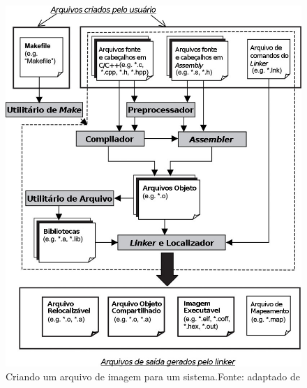 \begin{figure}[H]
    \scriptsize
     \centering
     \includegraphics[scale=0.42]{dados/figuras/Linker.png}
     \caption{Criando um arquivo de imagem para um sistema.\newline Fonte: adaptado de \cite{Qing2003}}
     \label{linker}
\end{figure}



